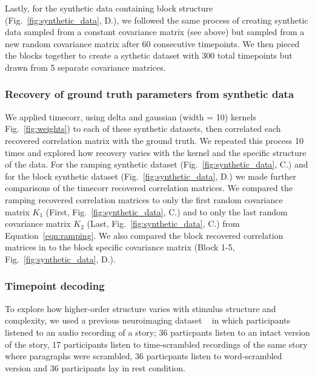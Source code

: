 \documentclass[english]{article}
\begin{document}
Lastly, for the synthetic data containing block structure (Fig.~\ref{fig:synthetic_data},  D.), we followed the same
process of creating synthetic data sampled from a constant covariance
matrix (see above) but sampled from a new random covariance matrix
after 60 consecutive timepoints.  We then pieced the blocks together
to create a sythetic dataset with 300 total timepoints but drawn from
5 separate covariance matrices. 

\subsubsection*{Recovery of ground truth parameters from synthetic
  data}


We applied timecorr, using delta and gaussian (width = 10) kernels
Fig.~\ref{fig:weights}) to each of these 
synthetic datasets, then correlated each recovered
correlation matrix with the ground truth.  We repeated this process 10
times and explored how recovery varies
with the kernel and the specific structure of the data. For the
ramping synthetic dataset (Fig.~\ref{fig:synthetic_data},  C.)  and for the
block synthetic dataset (Fig.~\ref{fig:synthetic_data},  D.)  we made further
comparisons of the timecorr recovered correlation matrices. We
compared the ramping recovered correlation matrices to only the first random covariance matrix $K_{1}$
(First, Fig.~\ref{fig:synthetic_data},  C.) and to only the last
random covariance matrix $K_{2}$ (Last, Fig.~\ref{fig:synthetic_data},
C.) from Equation~\ref{eqn:ramping}. We also compared the block recovered correlation matrices in to
the block specific covariance matrix (Block 1-5,
Fig.~\ref{fig:synthetic_data},  D.).


\subsubsection*{Timepoint decoding}

To explore how higher-order structure varies with stimulus structure
and complexity, we used a previous neuroimaging dataset
~\cite{SimoEtal16}  in which participants listened to an audio recording of a story; 36 particpants listen to an intact version of the story, 17 participants listen to time-scrambled recordings of the same story where paragraphs were scrambled, 36 particpants listen to word-scrambled version and 36 participants lay in rest condition.
\end{document}
